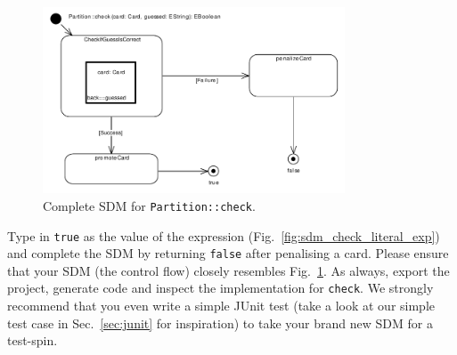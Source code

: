 \begin{figure}[htbp]
\begin{center}
  \includegraphics[width=0.8\textwidth]{pics/sdmBilder/check/sdm40}
  \caption{Complete SDM for \texttt{Partition::check}.}  
  \label{fig:sdm_check_finish}
\end{center}
\end{figure}

Type in \texttt{true} as the value of the expression
(Fig.~\ref{fig:sdm_check_literal_exp}) and complete the SDM by returning
\texttt{false} after penalising a card.  Please ensure that your SDM (the
control flow) closely resembles Fig.~\ref{fig:sdm_check_finish}.  As always,
export the project, generate code and inspect the implementation for
\texttt{check}.  We strongly recommend that you even write a simple JUnit test
(take a look at our simple test case in Sec.~\ref{sec:junit} for inspiration)
to take your brand new SDM for a test-spin.
